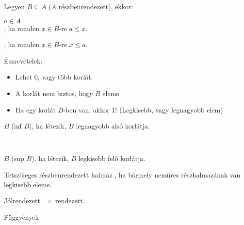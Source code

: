 \begin{frame}
\begin{tcolorbox}[title={Def.: Alsó korlát, Felső korlát}]
Legyen $B \subseteq A$ ($A$ részbenrendezett), ekkor:\\
\msmallskip

$a \in A$\\
, ha minden $x \in B$-re $a \leq x$.\\
\mmedskip

, ha minden $x \in B$-re $x \leq a$.\\
\mmedskip

Észrevételek:\\
\begin{itemize}
\item Lehet 0, vagy több korlát.
\item A korlát nem biztos, hogy $B$ eleme.
\item Ha egy korlát $B$-ben van, akkor 1! (Legkisebb, vagy legnagyobb elem)
\end{itemize}
\end{tcolorbox}

\begin{tcolorbox}[title={Def.: Infinum, Supremum}]
$B$  (inf $B$), ha létezik, $B$ legnagyobb alsó korlátja.\\
\mmedskip

\\
\mmedskip

$B$  (sup $B$), ha létezik, $B$ legkisebb felő korlátja.
\end{tcolorbox}

\begin{tcolorbox}[title={Def.: Jólrendezett halmaz}]
Tetszőleges részbenrendezett halmaz , ha bármely nemüres részhalmazának van legkisebb eleme.
\end{tcolorbox}

\begin{tcolorbox}[title={Ész}]
Jólrendezett $\Rightarrow$ rendezett.
\end{tcolorbox}
\end{frame}


\begin{frame}[plain]
\begin{tcolorbox}[center, colback={myyellow}, coltext={black}, colframe={myyellow}]
    {\RHuge Függvények}
    \mmedskip
\end{tcolorbox}
\end{frame}

